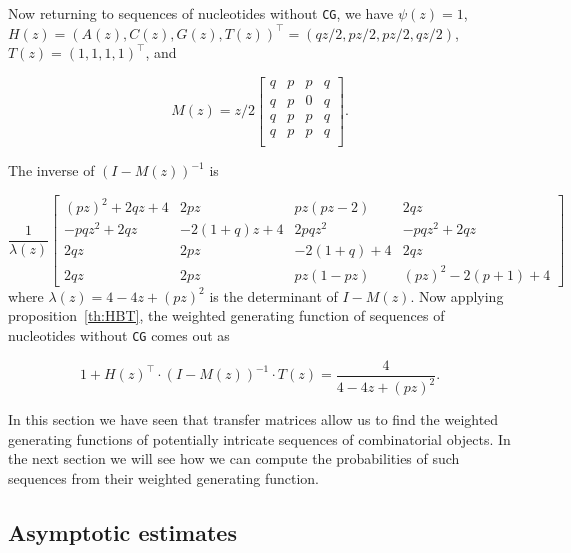 \documentclass{article}
\begin{document}
Now returning to sequences of nucleotides without \texttt{CG}, we have
$\psi(z) = 1$, $H(z) = (A(z),C(z),G(z),T(z))^\top =
(qz/2,pz/2,pz/2,qz/2)$, $T(z) = (1,1,1,1)^\top$, and

\begin{equation*}
M(z) = z/2
\begin{bmatrix}
q & p & p & q \\
q & p & 0 & q \\
q & p & p & q \\
q & p & p & q \\
\end{bmatrix}.
\end{equation*}

The inverse of $(I-M(z))^{-1}$ is

\begin{equation*}
\frac{1}{\lambda(z)} \left[
\begin{matrix}
(pz)^2+2qz+4   & 2pz        & pz(pz-2)   & 2qz                \\
-pqz^2+2qz     & -2(1+q)z+4 & 2pqz^2     & -pqz^2+2qz         \\
2qz            & 2pz        & -2(1+q)+4  & 2qz                \\
2qz            & 2pz        & pz(1-pz)   & (pz)^2 - 2(p+1) +4
\end{matrix}
\right]
\end{equation*}
where $\lambda(z) = 4 - 4z + (pz)^2$ is the determinant of $I-M(z)$. Now
applying proposition~\ref{th:HBT}, the weighted generating function of
sequences of nucleotides without \texttt{CG} comes out as

\begin{equation}
\label{eq:WGFnoCG}
1 + H(z)^\top \cdot (I-M(z))^{-1} \cdot T(z) = 
\frac{4}{4-4z+(pz)^2}.
\end{equation}

In this section we have seen that transfer matrices allow us to find the
weighted generating functions of potentially intricate sequences of
combinatorial objects. In the next section we will see how we can compute
the probabilities of such sequences from their weighted generating
function.





\subsection{Asymptotic estimates}
\label{sec:asest}
\end{document}
